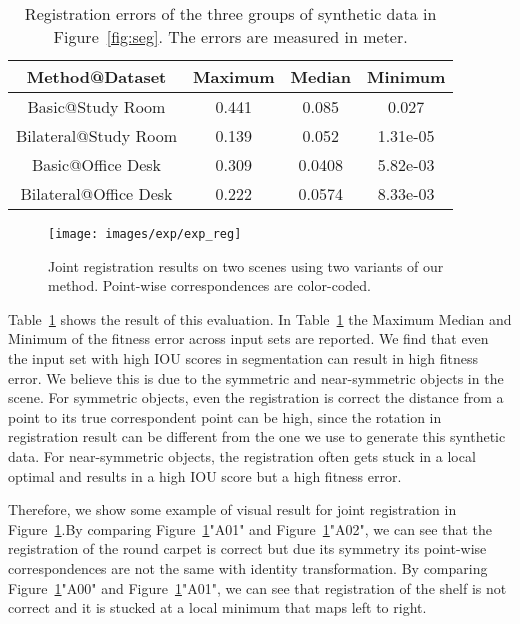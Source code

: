 \begin{table}
	\centering
	\caption{Registration errors of the three groups of synthetic data in Figure~\ref{fig:seg}. The errors are measured in meter.}
	\begin{tabular}{c | c c c}
		Method@Dataset&Maximum&Median&Minimum\\
		\hline 
		Basic@Study Room&0.441&0.085&0.027\\
		Bilateral@Study Room&0.139&0.052&1.31e-05\\
	    Basic@Office Desk&0.309&0.0408&5.82e-03\\
		Bilateral@Office Desk&0.222&0.0574&8.33e-03\\
	\end{tabular}
	\label{tab:regerror}
\end{table}
\begin{figure}[htb]
	\centering
	\texttt{[image: images/exp/exp\_reg]}
	\caption{Joint registration results on two scenes using two variants of our method. Point-wise correspondences are color-coded.}
	\label{fig:reg_colorcode}
\end{figure}
Table~\ref{tab:regerror} shows the result of this evaluation. In Table~\ref{tab:regerror} the Maximum Median and Minimum of the fitness error across input sets are reported.
%
We find that even the input set with high IOU scores in segmentation can result in high fitness error. We believe this is due to the symmetric and near-symmetric objects in the scene. For symmetric objects, even the registration is correct the distance from a point to its true correspondent point can be high, since the rotation in registration result can be different from the one we use to generate this synthetic data. For near-symmetric objects, the registration often gets stuck in a local optimal and results in a high IOU score but a high fitness error. 

Therefore, we show some example of visual result for joint registration in Figure~\ref{fig:reg_colorcode}.By comparing Figure~\ref{fig:reg_colorcode}"A01" and Figure~\ref{fig:reg_colorcode}"A02", we can see that the registration of the round carpet is correct but due its symmetry its point-wise correspondences are not the same with identity transformation.
By comparing Figure~\ref{fig:reg_colorcode}"A00" and Figure~\ref{fig:reg_colorcode}"A01", we can see that registration of the shelf is not correct and it is stucked at a local minimum that maps left to right.

